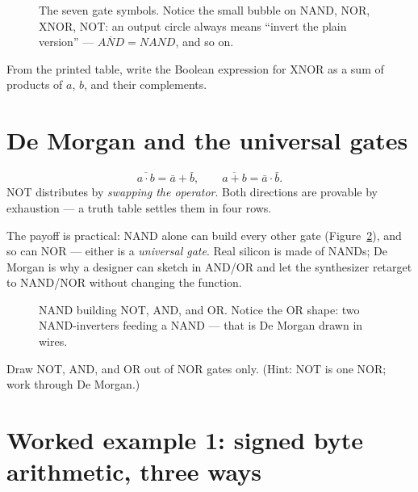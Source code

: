 \begin{figure}[htbp]
\centering

\caption{The seven gate symbols. Notice the small bubble on NAND, NOR,
XNOR, NOT: an output circle always means ``invert the plain version'' —
$\overline{AND}=NAND$, and so on.}
\label{fig:symbols}
\end{figure}

\begin{exercise}[medium]
From the printed table, write the Boolean expression for XNOR as a sum
of products of $a$, $b$, and their complements.
\end{exercise}

\section{De Morgan and the universal gates}
\label{sec:demorgan}

\begin{definition}
\[
\overline{a\cdot b}=\bar a+\bar b,
\qquad
\overline{a+b}=\bar a\cdot\bar b.
\]
NOT distributes by \emph{swapping the operator}. Both directions are
provable by exhaustion — a truth table settles them in four rows.
\end{definition}

The payoff is practical: NAND alone can build every other gate
(Figure~\ref{fig:universal}), and so can NOR — either is a
\emph{universal gate}. Real silicon is made of
NANDs; De Morgan is why a designer can sketch in AND/OR and let the
synthesizer retarget to NAND/NOR without changing the function.

\begin{figure}[htbp]
\centering

\caption{NAND building NOT, AND, and OR. Notice the OR shape: two
NAND-inverters feeding a NAND — that is De Morgan drawn in wires.}
\label{fig:universal}
\end{figure}

\begin{exercise}[medium]
Draw NOT, AND, and OR out of NOR gates only. (Hint: NOT is one NOR;
work through De Morgan.)
\end{exercise}

\section{Worked example 1: signed byte arithmetic, three ways}
\label{sec:we-bytes}

